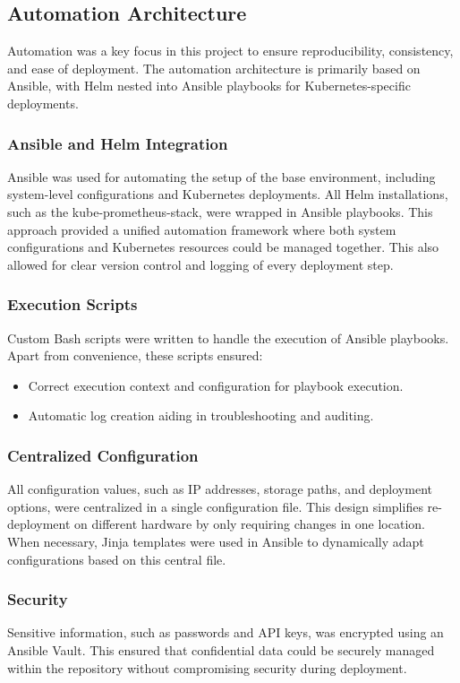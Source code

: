 \subsection{Automation Architecture}

Automation was a key focus in this project to ensure reproducibility, consistency, and ease of deployment. The automation architecture is primarily based on Ansible, with Helm nested into Ansible playbooks for Kubernetes-specific deployments.

\subsubsection{Ansible and Helm Integration}
Ansible was used for automating the setup of the base environment, including system-level configurations and Kubernetes deployments. All Helm installations, such as the kube-prometheus-stack, were wrapped in Ansible playbooks. This approach provided a unified automation framework where both system configurations and Kubernetes resources could be managed together. This also allowed for clear version control and logging of every deployment step.

\subsubsection{Execution Scripts}
Custom Bash scripts were written to handle the execution of Ansible playbooks. Apart from convenience, these scripts ensured:
\begin{itemize}
    \item Correct execution context and configuration for playbook execution.
    \item Automatic log creation aiding in troubleshooting and auditing.
\end{itemize}

\subsubsection{Centralized Configuration}
All configuration values, such as IP addresses, storage paths, and deployment options, were centralized in a single configuration file. This design simplifies re-deployment on different hardware by only requiring changes in one location. When necessary, Jinja templates were used in Ansible to dynamically adapt configurations based on this central file.

\subsubsection{Security}
Sensitive information, such as passwords and API keys, was encrypted using an Ansible Vault. This ensured that confidential data could be securely managed within the repository without compromising security during deployment.

